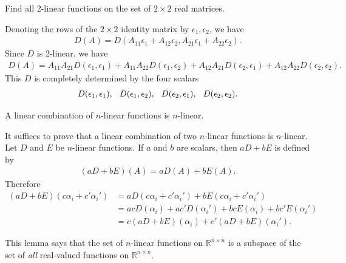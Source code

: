 \documentclass[12pt,letterpaper,reqno]{article}
\numberwithin{equation}{section}
\newcommand{\ti}[1]{\textit{#1}}
\begin{document}
\begin{exercise}
	Find all 2-linear functions on the set of $2 \times 2$ real matrices.	
\end{exercise}

{\color{red} 
Denoting the rows of the $2 \times 2$ identity matrix by $\epsilon_1, \epsilon_2$, we have 
\begin{align*}
	D(A)=D(A_{11}\epsilon_1+A_{12}\epsilon_{2},A_{21}\epsilon_1+A_{22}\epsilon_2).
\end{align*}
Since $D$ is 2-linear, we have 
\begin{align*}
	D(A)=A_{11}A_{21}D(\epsilon_1,\epsilon_1)+A_{11}A_{22}D(\epsilon_1,\epsilon_2)+A_{12}A_{21}D(\epsilon_2,\epsilon_1)+A_{12}A_{22}D(\epsilon_2,\epsilon_2).
\end{align*}
This $D$ is completely determined by the four scalars
\begin{align*}
	D(\epsilon_1,\epsilon_1), \hspace{0.25cm}D(\epsilon_1,\epsilon_2), \hspace{0.25cm}D(\epsilon_2,\epsilon_1), \hspace{0.25cm}D(\epsilon_2,\epsilon_2).
\end{align*}}

\begin{lem} \label{lem:linear_comb_of_n_linear_functions}
	A linear combination of $n$-linear functions is $n$-linear.
\end{lem}

\begin{pf}
It suffices to prove that a linear combination of two $n$-linear functions is $n$-linear. Let $D$ and $E$ be $n$-linear functions. If $a$ and $b$ are scalars, then $aD+bE$ is defined by
\begin{align*}
	(aD+bE)(A)=aD(A)+bE(A).
\end{align*}
Therefore
\begin{align*}
	(aD+bE)(c\alpha_i+c'\alpha_i')&=aD(c\alpha_i+c'\alpha_i')+bE(c\alpha_i+c'\alpha_i') \\
	&=acD(\alpha_i)+ac'D(\alpha_i')+bcE(\alpha_i)+bc'E(\alpha_i') \\
	&=c(aD+bE)(\alpha_i)+c'(aD+bE)(\alpha_i').
\end{align*}	
\end{pf}
This lemma says that the set of $n$-linear functions on $\mathbb{R}^{\overline{n} \times \overline{n}}$ is a subspace of the set of \ti{all} real-valued functions on $\mathbb{R}^{\overline{n} \times \overline{n}}$.
\end{document}
